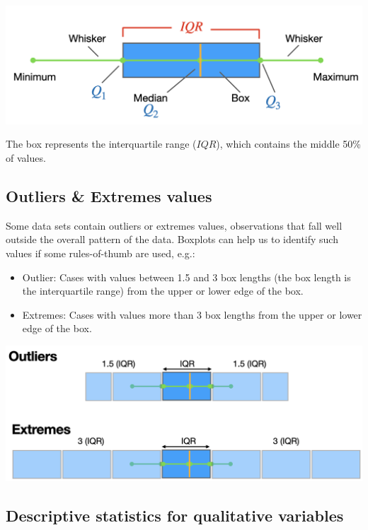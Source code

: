 \documentclass[
]{article}
\begin{document}
\begin{center}\includegraphics[width=0.6\linewidth,height=0.6\textheight]{boxplot3} \end{center}

The box represents the interquartile range (\(IQR\)), which contains the
middle 50\% of values.

\hypertarget{outliers-extremes-values}{%
\subsection{Outliers \& Extremes
values}\label{outliers-extremes-values}}

Some data sets contain outliers or extremes values, observations that
fall well outside the overall pattern of the data. Boxplots can help us
to identify such values if some rules-of-thumb are used, e.g.:

\begin{itemize}
\item
  Outlier: Cases with values between 1.5 and 3 box lengths (the box
  length is the interquartile range) from the upper or lower edge of the
  box.
\item
  Extremes: Cases with values more than 3 box lengths from the upper or
  lower edge of the box.
\end{itemize}

\begin{center}\includegraphics[width=0.6\linewidth,height=0.6\textheight]{outliers} \end{center}

\hypertarget{descriptive-statistics-for-qualitative-variables}{%
\subsection{Descriptive statistics for qualitative
variables}\label{descriptive-statistics-for-qualitative-variables}}
\end{document}
